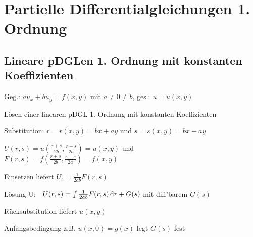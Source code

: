 \documentclass[german,color,5pt]{latex4ei/latex4ei_fs}
\begin{document}
\section{Partielle Differentialgleichungen 1. Ordnung}

\begin{sectionbox}
	\subsection{Lineare pDGLen 1. Ordnung mit konstanten Koeffizienten}
	Geg.: $a u_x+b u_y =f(x,y)$ mit $a \neq 0 \neq b$, ges.: $u=u(x,y)$
	\begin{cookbox}{Lösen einer linearen pDGL 1. Ordnung mit konstanten Koeffizienten}
		\item Substitution: $r=r(x,y)=bx+ay$ und $s=s(x,y)=bx-ay$
		\item $U(r,s) = u(\frac{r+s}{2b},\frac{r-s}{2a}) = u(x,y)$  und \\ $F(r,s) = f(\frac{r+s}{2b},\frac{r-s}{2a}) = f(x,y)$
		\item Einsetzen liefert $U_{r}=\frac{1}{2ab}F(r,s) $
		\item Lösung U: $\; \; U(r,s)=\int \frac{1}{2ab} F(r,s)\diff r+G(s)$ mit diff'barem $G(s)$
		\item Rücksubstitution liefert $u(x,y)$
		\item Anfangsbedingung z.B. $u(x,0) = g(x)$ legt $G(s)$ fest
	\end{cookbox}
\end{sectionbox}
\end{document}
